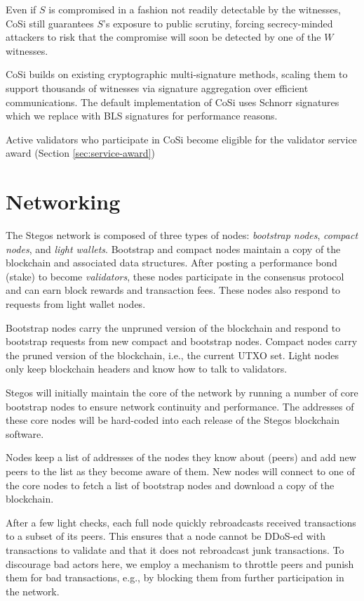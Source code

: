 \documentclass[8pt,fleqn,openany]{book}
\begin{document}
	Even if $S$ is compromised in a fashion not readily detectable by the witnesses, CoSi still guarantees $S$’s exposure to public scrutiny, forcing secrecy-minded attackers to risk that the compromise will soon be detected by one of the $W$ witnesses. 
	
	CoSi builds on existing cryptographic multi-signature methods, scaling them to support thousands of witnesses via signature aggregation over efficient communications. The default implementation of CoSi uses Schnorr signatures which we replace with BLS signatures for performance reasons.
	
	Active validators who participate in CoSi become eligible for the validator service award (Section \ref{sec:service-award})
	
	\section{Networking}
	The Stegos network is composed of three types of nodes: \textit{bootstrap nodes}, \textit{compact nodes}, and \textit{light wallets}. Bootstrap and compact nodes maintain a copy of the blockchain and associated data structures. After posting a performance bond (stake) to become \textit{validators}, these nodes participate in the consensus protocol and can earn block rewards and transaction fees. These nodes also respond to requests from light wallet nodes.
	
	Bootstrap nodes carry the unpruned version of the blockchain and respond to bootstrap requests from new compact and bootstrap nodes. Compact nodes carry the pruned version of the blockchain, i.e., the current UTXO set. Light nodes only keep blockchain headers and know how to talk to validators. 
	
	Stegos will initially maintain the core of the network by running a number of core bootstrap nodes to ensure network continuity and performance. The addresses of these core nodes will be hard-coded into each release of the Stegos blockchain software.
	
	Nodes keep a list of addresses of the nodes they know about (peers) and add new peers to the list as they become aware of them. New nodes will connect to one of the core nodes to fetch a list of bootstrap nodes and download a copy of the blockchain. 
	
	After a few light checks, each full node quickly rebroadcasts received transactions to a subset of its peers. This ensures that a node cannot be DDoS-ed with transactions to validate and that it does not rebroadcast junk transactions. To discourage bad actors here, we employ a mechanism to throttle peers and punish them for bad transactions, e.g., by blocking them from further participation in the network.
	
\end{document}
